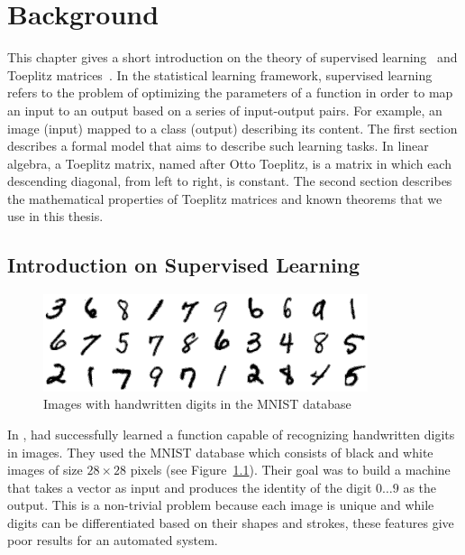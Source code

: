 \chapter{Background}
\label{chapter:background}
\localtableofcontents
\vspace{\marginbellowtable}


This chapter gives a short introduction on the theory of supervised learning~\cite{shalev2014understanding} and Toeplitz matrices~\cite{gray2006toeplitz}.
In the statistical learning framework, supervised learning refers to the problem of optimizing the parameters of a function in order to map an input to an output based on a series of input-output pairs.
For example, an image (input) mapped to a class (output) describing its content.
The first section describes a formal model that aims to describe such learning tasks.
In linear algebra, a Toeplitz matrix, named after Otto Toeplitz, is a matrix in which each descending diagonal, from left to right, is constant.
The second section describes the mathematical properties of Toeplitz matrices and known theorems that we use in this thesis. 


\section{Introduction on Supervised Learning}
\label{section:ch2-introduction_on_supervised_learning}

\begin{figure}[t]
  \centering
  \includegraphics[width=0.85\textwidth]{figures/main/ch2-background/mnist-dataset.png}
  \caption{Images with handwritten digits in the MNIST database \cite{lecun1998gradient}}
  \label{figure:ch2-mnist-database}
\end{figure}


In \citeyear{lecun1998gradient}, \citeauthor{lecun1998gradient} had successfully learned a function capable of recognizing handwritten digits in images.
They used the MNIST database \cite{lecun1998gradient} which consists of black and white images of size $28 \times 28$ pixels (see Figure~\ref{figure:ch2-mnist-database}).
Their goal was to build a machine that takes a vector as input and produces the identity of the digit $0 \dots 9$ as the output.
This is a non-trivial problem because each image is unique and while digits can be differentiated based on their shapes and strokes, these features give poor results for an automated system. 

